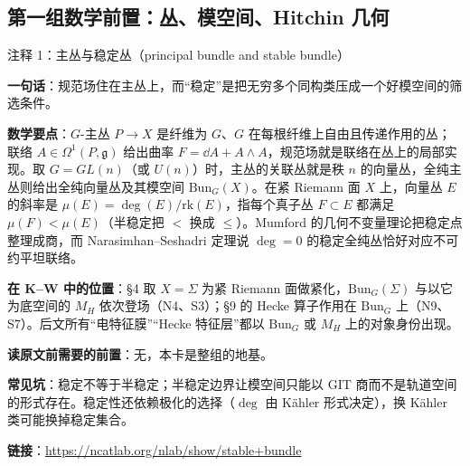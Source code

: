 \subsection*{第一组\quad 数学前置：丛、模空间、Hitchin 几何}

\begin{kcard}{注释 1：主丛与稳定丛（principal bundle and stable bundle）}

\textbf{一句话}：规范场住在主丛上，而“稳定”是把无穷多个同构类压成一个好模空间的筛选条件。

\textbf{数学要点}：$G$-主丛 $P\to X$ 是纤维为 $G$、$G$ 在每根纤维上自由且传递作用的丛；联络 $A\in\Omega^1(P,\mathfrak{g})$ 给出曲率 $F=\dd A+A\wedge A$，规范场就是联络在丛上的局部实现。取 $G=GL(n)$（或 $U(n)$）时，主丛的关联丛就是秩 $n$ 的向量丛，全纯主丛则给出全纯向量丛及其模空间 $\mathrm{Bun}_G(X)$。在紧 Riemann 面 $X$ 上，向量丛 $E$ 的斜率是 $\mu(E)=\deg(E)/\mathrm{rk}(E)$，指每个真子丛 $F\subset E$ 都满足 $\mu(F)<\mu(E)$（半稳定把 $<$ 换成 $\le$）。Mumford 的几何不变量理论把稳定点整理成商，而 Narasimhan--Seshadri 定理说 $\deg=0$ 的稳定全纯丛恰好对应不可约平坦联络。

\textbf{在 K--W 中的位置}：§4 取 $X=\Sigma$ 为紧 Riemann 面做紧化，$\mathrm{Bun}_G(\Sigma)$ 与以它为底空间的 $M_H$ 依次登场（N4、S3）；§9 的 Hecke 算子作用在 $\mathrm{Bun}_G$ 上（N9、S7）。后文所有“电特征膜”“Hecke 特征层”都以 $\mathrm{Bun}_G$ 或 $M_H$ 上的对象身份出现。

\textbf{读原文前需要的前置}：无，本卡是整组的地基。

\textbf{常见坑}：稳定不等于半稳定；半稳定边界让模空间只能以 GIT 商而不是轨道空间的形式存在。稳定性还依赖极化的选择（$\deg$ 由 Kähler 形式决定），换 Kähler 类可能换掉稳定集合。

\noindent\textbf{链接}：\url{https://ncatlab.org/nlab/show/stable+bundle}
\end{kcard}

